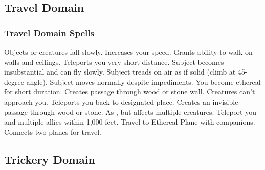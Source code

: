 \subsection{Travel Domain}

\subsubsection{Travel Domain Spells}
\begin{spelllist}
   Objects or creatures fall slowly.
   Increases your speed.
  \spellhead[2]{}
   Grants ability to walk on walls and ceilings.
   Teleports you very short distance.
   Subject becomes insubstantial and can fly slowly.
   Subject treads on air as if solid (climb at 45-degree angle).
   Subject moves normally despite impediments.
   You become ethereal for short duration.
   Creates passage through wood or stone wall.
   Creatures can't approach you.
   Teleports you back to designated place.
  \spellhead[7]{}
   Creates an invisible passage through wood or stone.
   As , but affects multiple creatures.
   Teleport you and multiple allies within 1,000 feet.
   Travel to Ethereal Plane with companions.
   Connects two planes for travel.
\end{spelllist}

\subsection{Trickery Domain}
